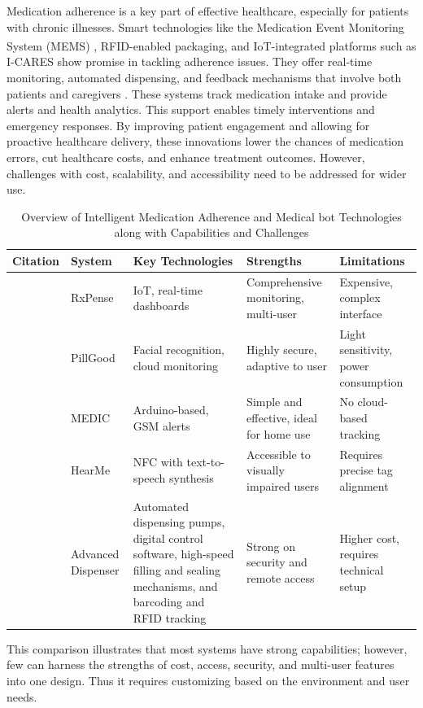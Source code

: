 Medication adherence is a key part of effective healthcare, especially for patients with chronic illnesses. Smart technologies like the Medication Event Monitoring System (MEMS\textsuperscript{\textregistered}) \cite{43}, RFID-enabled packaging, and IoT-integrated platforms such as I-CARES show promise in tackling adherence issues. They offer real-time monitoring, automated dispensing, and feedback mechanisms that involve both patients and caregivers \cite{48}. These systems track medication intake and provide alerts and health analytics. This support enables timely interventions and emergency responses. By improving patient engagement and allowing for proactive healthcare delivery, these innovations lower the chances of medication errors, cut healthcare costs, and enhance treatment outcomes. However, challenges with cost, scalability, and accessibility need to be addressed for wider use.
\begin{table}[h!]
\centering
\caption{Overview of Intelligent Medication Adherence and Medical bot Technologies along with Capabilities and Challenges}
\label{tab:adherence_tech}
\begin{tabular}{|p{1.5cm}|p{2.2cm}|p{3.5cm}|p{3.5cm}|p{3.3cm}|}
\hline
\textbf{Citation} & \textbf{System} & \textbf{Key Technologies} & \textbf{Strengths} & \textbf{Limitations} \\ \hline
\cite{49} & RxPense & IoT, real-time dashboards & Comprehensive monitoring, multi-user & Expensive, complex interface \\ \hline
\cite{50} & PillGood & Facial recognition, cloud monitoring & Highly secure, adaptive to user & Light sensitivity, power consumption \\ \hline
\cite{51} & MEDIC & Arduino-based, GSM alerts & Simple and effective, ideal for home use & No cloud-based tracking \\ \hline
\cite{52} & HearMe & NFC with text-to-speech synthesis & Accessible to visually impaired users & Requires precise tag alignment \\ \hline
\cite{53} & Advanced Dispenser & Automated dispensing pumps, digital control software, high-speed filling and sealing mechanisms, and barcoding and RFID tracking & Strong on security and remote access & Higher cost, requires technical setup \\ \hline
\end{tabular}
\end{table}

This comparison illustrates that most systems have strong capabilities; however, few can harness the strengths of cost, access, security, and multi-user features into one design. Thus it requires customizing based on the environment and user needs.


